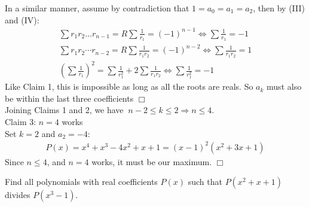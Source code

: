 \begin{solution}[$n=4$]
        In a similar manner, assume by contradiction that $1 = a_0 = a_1 = a_2$, then by (III) and (IV):
        \begin{align*}
            \sum r_1 r_2 \ldots r_{n-1} = R \sum \frac{1}{r_1} = (-1)^{n-1}\iff \sum \frac{1}{r_1} = -1 \\
            \sum r_1r_2 \cdots r_{n-2} = R \sum \frac{1}{r_1 r_2} = (-1)^{n-2} \iff \sum \frac{1}{r_1 r_2} = 1 \\
            \left( \sum \frac{1}{r_1}\right)^2 = \sum \frac{1}{r_1^2} + 2\sum \frac{1}{r_1 r_2} \iff \sum \frac{1}{r_1^2} = -1
        \end{align*}
        Like Claim 1, this is impossible as long as all the roots are reals. So $a_k$ must also be within the last three coefficients $\Box$ \\[1.5mm]
        Joining Claims 1 and 2, we have $\ n-2 \leq k \leq 2 \Rightarrow n \leq 4$. \\[2mm]
    Claim 3: $n=4$ works \\[1.2mm]
        Set $k = 2$ and $a_2 = -4$:
        \begin{align*}
            P(x) = x^4 + x^3 - 4x^2+ x + 1 = (x-1)^2 (x^2+3x+1)
        \end{align*}
        Since $n \leq 4$, and $n=4$ works, it must be our maximum. $\Box$
\end{solution}

\begin{problem}[A][9][INMO 2018]
    Find all polynomials with real coefficients \( P(x) \) such that  
\( P(x^2 + x + 1) \) divides \( P(x^3 - 1) \).
\end{problem}

